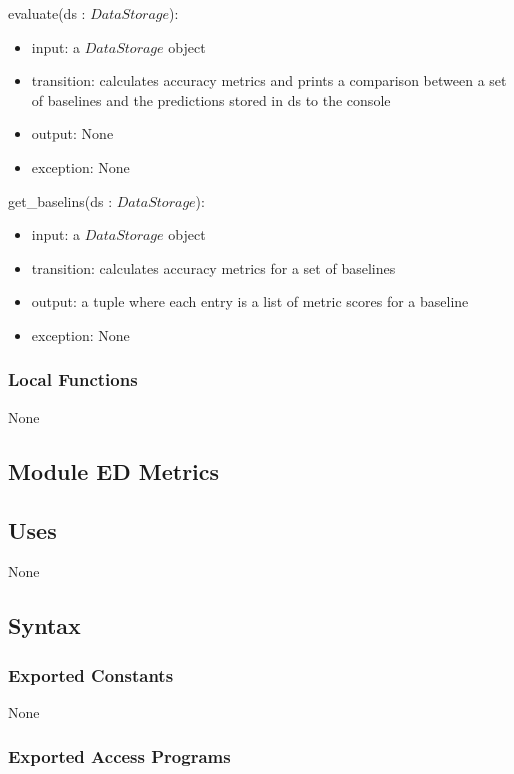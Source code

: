 \documentclass[12pt, titlepage]{article}
\begin{document}
\noindent evaluate(ds : $DataStorage$):
\begin{itemize}
\item input: a $DataStorage$ object
\item transition: calculates accuracy metrics and prints a comparison between a set of baselines and the predictions stored in ds to the console
\item output: None
\item exception: None
\end{itemize}

\noindent get\_baselins(ds : $DataStorage$):
\begin{itemize}
\item input: a $DataStorage$ object
\item transition: calculates accuracy metrics for a set of baselines
\item output: a tuple where each entry is a list of metric scores for a baseline
\item exception: None
\end{itemize}

\subsubsection{Local Functions}

None


\subsection{Module ED Metrics}

\subsection{Uses}

None

\subsection{Syntax}

\subsubsection{Exported Constants}

None

\subsubsection{Exported Access Programs}
\end{document}
